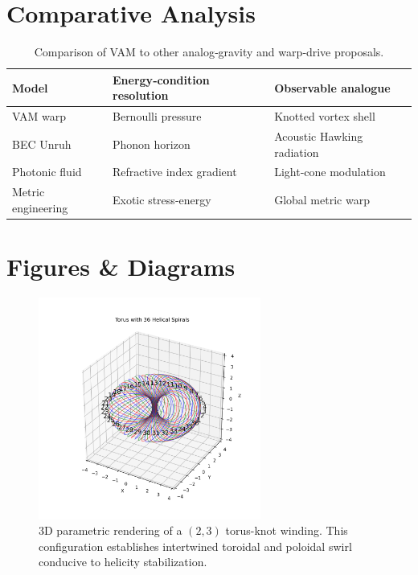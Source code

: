 \documentclass[preprint,notitlepage]{revtex4-2}
\begin{document}
\section{Comparative Analysis}
    \begin{table}[H]
    \centering
    \renewcommand{\arraystretch}{1.2}
    \begin{tabular}{|l|l|l|}
    \hline
    Model & Energy‐condition resolution & Observable analogue \\
    \hline
    VAM warp & Bernoulli pressure & Knotted vortex shell \\
    BEC Unruh & Phonon horizon & Acoustic Hawking radiation \\
    Photonic fluid & Refractive index gradient & Light‐cone modulation \\
    Metric engineering & Exotic stress‐energy & Global metric warp \\
    \hline
    \end{tabular}
    \caption{Comparison of VAM to other analog‐gravity and warp‐drive proposals.}
    \end{table}

\section{Figures \& Diagrams}
\begin{figure}[H]
  \centering
  \includegraphics[width=0.65\textwidth]{exports/swirltorus3}
  \caption{3D parametric rendering of a $(2,3)$ torus-knot winding. This configuration establishes intertwined toroidal and poloidal swirl conducive to helicity stabilization.}
  \label{fig:torus36}
\end{figure}
\end{document}
